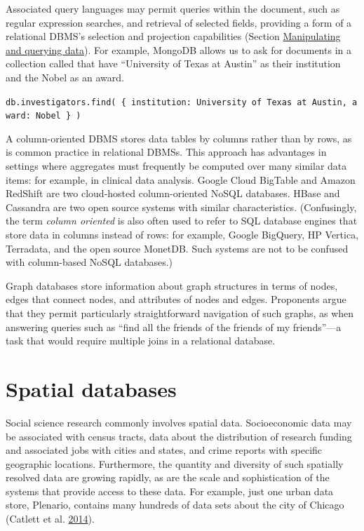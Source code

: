 \documentclass[]{krantz}
\begin{document}
Associated query languages may permit queries within the document, such
as regular expression searches, and retrieval of selected fields,
providing a form of a relational DBMS's selection and projection
capabilities (Section \protect\hyperlink{sec:db:sql}{Manipulating and
querying data}). For example, MongoDB allows us to ask for documents in
a collection called that have ``University of Texas at Austin'' as their
institution and the Nobel as an award.

\texttt{db.investigators.find(\ \{\ institution:\ \textquotesingle{}University\ of\ Texas\ at\ Austin\textquotesingle{},\ award:\ \textquotesingle{}Nobel\textquotesingle{}\ \}\ )}

A column-oriented DBMS stores data tables by columns rather than by
rows, as is common practice in relational DBMSs. This approach has
advantages in settings where aggregates must frequently be computed over
many similar data items: for example, in clinical data analysis. Google
Cloud BigTable and Amazon RedShift are two cloud-hosted column-oriented
NoSQL databases. HBase and Cassandra are two open source systems with
similar characteristics. (Confusingly, the term \emph{column oriented}
is also often used to refer to SQL database engines that store data in
columns instead of rows: for example, Google BigQuery, HP Vertica,
Terradata, and the open source MonetDB. Such systems are not to be
confused with column-based NoSQL databases.)

Graph databases store information about graph structures in terms of
nodes, edges that connect nodes, and attributes of nodes and edges.
Proponents argue that they permit particularly straightforward
navigation of such graphs, as when answering queries such as ``find all
the friends of the friends of my friends''---a task that would require
multiple joins in a relational database.

\hypertarget{sec:db:spatial}{\section{Spatial
databases}\label{sec:db:spatial}}

Social science research commonly involves spatial data. Socioeconomic
data may be associated with census tracts, data about the distribution
of research funding and associated jobs with cities and states, and
crime reports with specific geographic locations. Furthermore, the
quantity and diversity of such spatially resolved data are growing
rapidly, as are the scale and sophistication of the systems that provide
access to these data. For example, just one urban data store, Plenario,
contains many hundreds of data sets about the city of Chicago (Catlett
et al. \protect\hyperlink{ref-plenario}{2014}).
\end{document}
